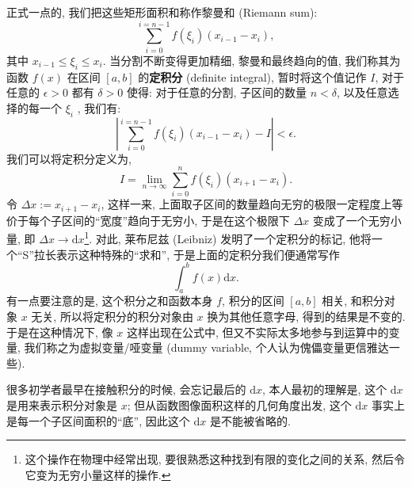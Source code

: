\begin{tcolorbox}[size=fbox, breakable, enhanced jigsaw, title={积分 (integration)}]
正式一点的, 我们把这些矩形面积和称作黎曼和 (Riemann sum): \[
\sum_{i=0}^{i=n-1}f(\xi_i)(x_{i-1}-x_i),
\] 其中 \(x_{i-1}\le\xi_i\le x_i\). 当分割不断变得更加精细,
黎曼和最终趋向的值, 我们称其为函数 \(f(x)\) 在区间 \([a,b]\)
的\textbf{定积分} (definite integral), 暂时将这个值记作 \(I\),
对于任意的 \(\epsilon>0\) 都有 \(\delta>0\) 使得: 对于任意的分割,
子区间的数量 \(n<\delta\), 以及任意选择的每一个 \(\xi_i\) , 我们有: \[
\left|\sum_{i=0}^{i=n-1}f(\xi_i)(x_{i-1}-x_i)-I\right|<\epsilon.
\] 我们可以将定积分定义为, \[
\boxed{I=\lim_{n\rightarrow\infty}\sum_{i=0}^nf(\xi_i)(x_{i+1}-x_i).}
\] 令 \(\Delta x:=x_{i+1}-x_i\), 这样一来,
上面取子区间的数量趋向无穷的极限一定程度上等价于每个子区间的``宽度''趋向于无穷小,
于是在这个极限下 \(\Delta x\) 变成了一个无穷小量, 即
\(\Delta x\rightarrow \mathrm{d}x\)\footnote{这个操作在物理中经常出现,
  要很熟悉这种找到有限的变化之间的关系, 然后令它变为无穷小量这样的操作.}.
对此, 莱布尼兹 (Leibniz) 发明了一个定积分的标记,
他将一个``S''拉长表示这种特殊的``求和'', 于是上面的定积分我们便通常写作
\[
\boxed{\int_a^bf(x)\mathrm{d}x.}
\] 有一点要注意的是, 这个积分之和函数本身 \(f\), 积分的区间 \([a,b]\)
相关, 和积分对象 \(x\) 无关, 所以将定积分的积分对象由 \(x\)
换为其他任意字母, 得到的结果是不变的. 于是在这种情况下, 像 \(x\)
这样出现在公式中, 但又不实际太多地参与到运算中的变量,
我们称之为虚拟变量/哑变量 (dummy variable,
个人认为傀儡变量更信雅达一些).

\begin{newquote}
很多初学者最早在接触积分的时候, 会忘记最后的 \(\mathrm{d}x\),
本人最初的理解是, 这个 \(\mathrm{d}x\) 是用来表示积分对象是 \(x\);
但从函数图像面积这样的几何角度出发, 这个 \(\mathrm{d}x\)
事实上是每一个子区间面积的``底'', 因此这个 \(\mathrm{d}x\)
是不能被省略的.
\end{newquote}

\end{tcolorbox}

